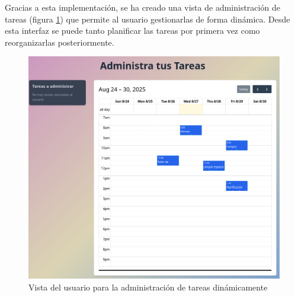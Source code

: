 Gracias a esta implementación, se ha creado una vista de administración de tareas (figura \ref{fig:admin-tareas}) que permite al usuario gestionarlas de forma dinámica. Desde esta interfaz se puede tanto planificar las tareas por primera vez como reorganizarlas posteriormente.
\begin{figure}[h!]
  \centering
  \includegraphics[width=1\textwidth]{fotos/admi-tareas.png}
  \caption{Vista del usuario para la administración de tareas dinámicamente}
  \label{fig:admin-tareas}
\end{figure}
